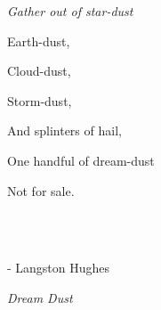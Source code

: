 \thispagestyle{empty}
\vspace*{\fill}

\begin{flushright}
\large {\em Gather out of star-dust 

Earth-dust,

Cloud-dust,

Storm-dust,

And splinters of hail,

One handful of dream-dust

Not for sale.}\\

\ \

\normalsize

{- Langston Hughes}  

{\em Dream Dust}

\end{flushright}


\vspace*{\fill}
\vspace*{\fill}


\vspace*{\fill}

\vspace*{\fill}

\vspace*{\fill}


